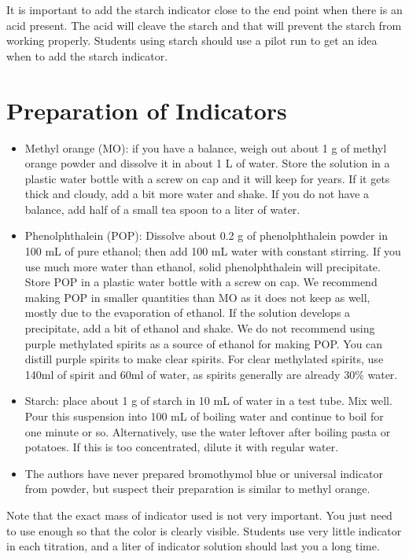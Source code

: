 It is important to add the starch indicator close to the end point when there is an acid present. The acid will cleave the starch and that will prevent the starch from working properly. Students using starch should use a pilot run to get an idea when to add the starch indicator.

\section{Preparation of Indicators}
\begin{itemize}

\item{Methyl orange (MO): if you have a balance, weigh out about 1 g of methyl orange powder and dissolve it in about 1 L of water. Store the solution in a plastic water bottle with a screw on cap and it will keep for years. If it gets thick and cloudy, add a bit more water and shake. If you do not have a balance, add half of a small tea spoon to a liter of water.}

\item{Phenolphthalein (POP): Dissolve about 0.2 g of phenolphthalein powder in 100 mL of pure ethanol; then add 100 mL water with constant stirring. If you use much more water than ethanol, solid phenolphthalein will precipitate. Store POP in a plastic water bottle with a screw on cap. We recommend making POP in smaller quantities than MO as it does not keep as well, mostly due to the evaporation of ethanol. If the solution develops a precipitate, add a bit of ethanol and shake. We do not recommend using purple methylated spirits as a source of ethanol for making POP. You can distill purple spirits to make clear spirits. For clear methylated spirits, use 140ml of spirit and 60ml of water, as spirits generally are already 30\% water.}

\item{Starch: place about 1 g of starch in 10 mL of water in a test tube. Mix well. Pour this suspension into 100 mL of boiling water and continue to boil for one minute or so. Alternatively, use the water leftover after boiling pasta or potatoes. If this is too concentrated, dilute it with regular water.}

\item{The authors have never prepared bromothymol blue or universal indicator from powder, but suspect their preparation is similar to methyl orange.}

\end{itemize}

Note that the exact mass of indicator used is not very important. You just need to use enough so that the color is clearly visible. Students use very little indicator in each titration, and a liter of indicator solution should last you a long time.
